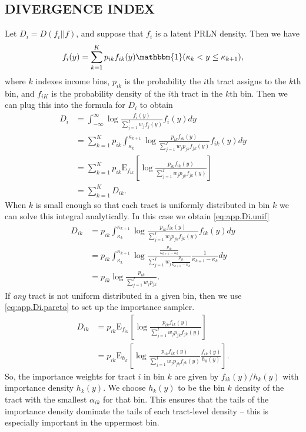 \documentclass[12pt]{article}
\newcommand{\E}{\mathrm{E}}
\begin{document}
\subsection{DIVERGENCE INDEX}\label{app:compute.div}
Let $D_i = D(f_i||f)$, and suppose that $f_i$ is a latent PRLN density. Then we have
\begin{align*}
f_i(y) = \sum_{k=1}^Kp_{ik}f_{ik}(y)\mathbbm{1}(\kappa_{k} < y \leq \kappa_{k+1}),
\end{align*}
where $k$ indexes income bins, $p_{ik}$ is the probability the $i$th tract assigns to the $k$th bin, and $f_{iK}$ is the probability density of the $i$th tract in the $k$th bin. Then we can plug this into the formula for $D_i$ to obtain
\begin{align*}
  D_i & = \int_{-\infty}^{\infty}\log \frac{f_i(y)}{\sum_{j=1}^Iw_jf_j(y)}f_i(y)dy \\
      & = \sum_{k=1}^Kp_{ik}\int_{\kappa_k}^{\kappa_{k+1}}\log\frac{p_{ik}f_{ik}(y)}{\sum_{j=1}^{I}w_jp_{jk}f_{jk}(y)}f_{ik}(y)dy \\
      & = \sum_{k=1}^Kp_{ik}\E_{f_{ik}}\left[\log\frac{p_{ik}f_{ik}(y)}{\sum_{j=1}^{I}w_jp_{jk}f_{jk}(y)}\right] \\
      & = \sum_{k=1}^KD_{ik}.
\end{align*}
When $k$ is small enough so that each tract is uniformly distributed in bin $k$ we can solve this integral analytically. In this case we obtain \eqref{eq:app.Di.unif}
\begin{align}
  D_{ik} & = p_{ik} \int_{\kappa_k}^{\kappa_{k+1}}\log\frac{p_{ik}f_{ik}(y)}{\sum_{j=1}^{I}w_jp_{jk}f_{jk}(y)}f_{ik}(y)dy \nonumber \\
        & = p_{ik} \int_{\kappa_k}^{\kappa_{k+1}}\log\frac{\frac{p_{ik}}{\kappa_{k+1} - \kappa_{k}}}{\sum_{j=1}^Iw_j \frac{p_{jk}}{\kappa_{k+1} - \kappa_k}}\frac{1}{\kappa_{k+1} - \kappa_k} dy \nonumber\\
  & = p_{ik}\log\frac{p_{ik}}{\sum_{j=1}^Iw_jp_{jk}}. \label{eq:app.Di.unif}
\end{align}
If \emph{any} tract is not uniform distributed in a given bin, then we use \eqref{eq:app.Di.pareto} to set up the importance sampler.
\begin{align}
  D_{ik} & = p_{ik}\E_{f_{ik}}\left[\log\frac{p_{ik}f_{ik}(y)}{\sum_{j=1}^{I}w_jp_{jk}f_{jk}(y)}\right] \nonumber\\
  & = p_{ik}\E_{h_{k}}\left[\log\frac{p_{ik}f_{ik}(y)}{\sum_{j=1}^{I}w_jp_{jk}f_{jk}(y)}\frac{f_{ik}(y)}{h_k(y)}\right]. \label{eq:app.Di.pareto}
\end{align}
So, the importance weights for tract $i$ in bin $k$ are given by $f_{ik}(y) / h_k(y)$ with importance density $h_k(y)$. We choose $h_k(y)$ to be the bin $k$ density of the tract with the smallest $\alpha_{ik}$ for that bin. This ensures that the tails of the importance density dominate the tails of each tract-level density -- this is especially important in the uppermost bin.
\end{document}

